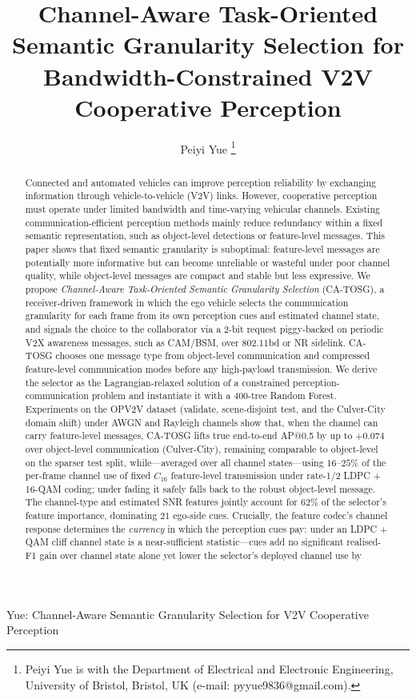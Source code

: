 \documentclass[journal]{IEEEtran}
\newcommand{\method}{CA-TOSG}
\begin{document}
\title{Channel-Aware Task-Oriented Semantic Granularity Selection for Bandwidth-Constrained V2V Cooperative Perception}

\author{
Peiyi Yue%
\thanks{Peiyi Yue is with the Department of Electrical and Electronic Engineering, University of Bristol, Bristol, UK (e-mail: pyyue9836@gmail.com).}
}

{Yue: Channel-Aware Semantic Granularity Selection for V2V Cooperative Perception}

\maketitle

\begin{abstract}
Connected and automated vehicles can improve perception reliability by exchanging information through vehicle-to-vehicle (V2V) links. However, cooperative perception must operate under limited bandwidth and time-varying vehicular channels. Existing communication-efficient perception methods mainly reduce redundancy within a fixed semantic representation, such as object-level detections or feature-level messages. This paper shows that fixed semantic granularity is suboptimal: feature-level messages are potentially more informative but can become unreliable or wasteful under poor channel quality, while object-level messages are compact and stable but less expressive. We propose \emph{Channel-Aware Task-Oriented Semantic Granularity Selection} (\method), a receiver-driven framework in which the ego vehicle selects the communication granularity for each frame from its own perception cues and estimated channel state, and signals the choice to the collaborator via a $2$-bit request piggy-backed on periodic V2X awareness messages, such as CAM/BSM, over 802.11bd or NR sidelink. \method{} chooses one message type from object-level communication and compressed feature-level communication modes before any high-payload transmission. We derive the selector as the Lagrangian-relaxed solution of a constrained perception-communication problem and instantiate it with a $400$-tree Random Forest. Experiments on the OPV2V dataset (validate, scene-disjoint test, and the Culver-City domain shift) under AWGN and Rayleigh channels show that, when the channel can carry feature-level messages, \method{} lifts true end-to-end AP@0.5 by up to $+0.074$ over object-level communication (Culver-City), remaining comparable to object-level on the sparser test split, while---averaged over all channel states---using $16$--$25\%$ of the per-frame channel use of fixed $C_{16}$ feature-level transmission under rate-1/2 LDPC + 16-QAM coding; under fading it safely falls back to the robust object-level message. The channel-type and estimated SNR features jointly account for $62\%$ of the selector's feature importance, dominating $21$ ego-side cues. Crucially, the feature codec's channel response determines the \emph{currency} in which the perception cues pay: under an LDPC + QAM cliff channel state is a near-sufficient statistic---cues add no significant realised-F1 gain over channel state alone yet lower the selector's deployed channel use by 
\end{abstract}
\end{document}
